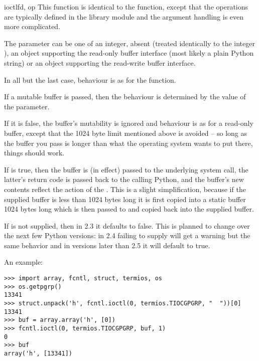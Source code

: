 \begin{funcdesc}{ioctl}{fd, op}
  This function is identical to the  function,
  except that the operations are typically defined in the library
  module  and the argument handling is even more
  complicated.
  
  The parameter  can be one of an integer, absent (treated
  identically to the integer ), an object supporting the
  read-only buffer interface (most likely a plain Python string) or an
  object supporting the read-write buffer interface.
  
  In all but the last case, behaviour is as for the 
  function.
  
  If a mutable buffer is passed, then the behaviour is determined by
  the value of the  parameter.
  
  If it is false, the buffer's mutability is ignored and behaviour is
  as for a read-only buffer, except that the 1024 byte limit mentioned
  above is avoided -- so long as the buffer you pass is longer than
  what the operating system wants to put there, things should work.
  
  If  is true, then the buffer is (in effect) passed
  to the underlying  system call, the latter's
  return code is passed back to the calling Python, and the buffer's
  new contents reflect the action of the .  This is a
  slight simplification, because if the supplied buffer is less than
  1024 bytes long it is first copied into a static buffer 1024 bytes
  long which is then passed to  and copied back into
  the supplied buffer.
  
  If  is not supplied, then in 2.3 it defaults to
  false.  This is planned to change over the next few Python versions:
  in 2.4 failing to supply  will get a warning but
  the same behavior and in versions later than 2.5 it will default to
  true.

  An example:

\begin{verbatim}
>>> import array, fcntl, struct, termios, os
>>> os.getpgrp()
13341
>>> struct.unpack('h', fcntl.ioctl(0, termios.TIOCGPGRP, "  "))[0]
13341
>>> buf = array.array('h', [0])
>>> fcntl.ioctl(0, termios.TIOCGPGRP, buf, 1)
0
>>> buf
array('h', [13341])
\end{verbatim}
\end{funcdesc}

